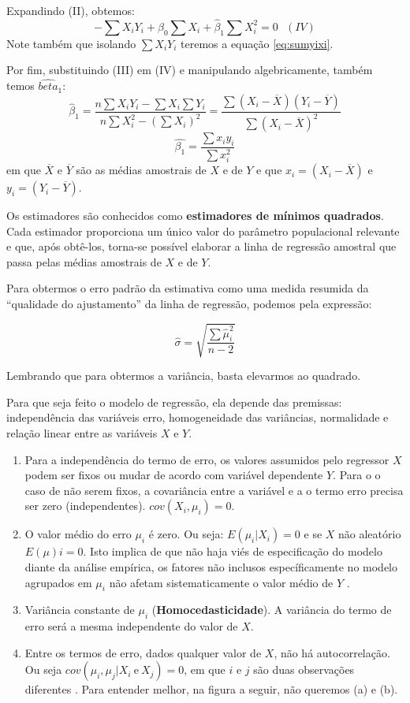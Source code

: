 \documentclass[
  openany]{book}
\begin{document}
Expandindo (II), obtemos:
\[-\sum X_iY_i+\hat{\beta}_0\sum X_i+\hat{\beta}_1\sum X_i^2=0 \ \ \ (IV)\]
Note também que isolando \(\sum X_i Y_i\) teremos a equação \eqref{eq:sumyixi}.

Por fim, substituindo (III) em (IV) e manipulando algebricamente, também temos \(\hat{beta}_1\):
\[\hat{\beta}_1=\frac{n\sum X_iY_i-\sum X_i \sum Y_i}{n\sum X_i^2-(\sum X_i)^2}=\frac{\sum (X_i-\overline{X})(Y_i-\overline{Y})}{\sum(X_i-\overline{X})^2}\]
\begin{equation}
\hat{\beta_1}=\frac{\sum x_i y_i}{\sum x_i^2}
\label{eq:betaum}
\end{equation}
em que \(\overline{X}\) e \(\overline{Y}\) são as médias amostrais de \(X\) e de \(Y\) e que \(x_i=(X_i-\overline{X})\) e \(y_i=(Y_i-\overline{Y})\).

Os estimadores são conhecidos como \textbf{estimadores de mínimos quadrados}. Cada estimador proporciona um único valor do parâmetro populacional relevante e que, após obtê-los, torna-se possível elaborar a linha de regressão amostral que passa pelas médias amostrais de \(X\) e de \(Y\).

Para obtermos o erro padrão da estimativa como uma medida resumida da ``qualidade do ajustamento'' da linha de regressão, podemos pela expressão:

\begin{equation}
\hat{\sigma}=\sqrt{\frac{\sum \hat{\mu}_i^2}{n-2}}
\label{eq:desvioreg}
\end{equation}

Lembrando que para obtermos a variância, basta elevarmos ao quadrado.

Para que seja feito o modelo de regressão, ela depende das premissas: independência das variáveis erro, homogeneidade das variâncias, normalidade e relação linear entre as variáveis \(X\) e \(Y\).

\begin{enumerate}
\def\labelenumi{\arabic{enumi}.}
\item
  Para a independência do termo de erro, os valores assumidos pelo regressor \(X\) podem ser fixos ou mudar de acordo com variável dependente \(Y\). Para o o caso de não serem fixos, a covariância entre a variável e a o termo erro precisa ser zero (independentes). \(cov(X_i,\mu_i)=0\).
\item
  O valor médio do erro \(\mu_i\) é zero. Ou seja: \(E(\mu_i|X_i)=0\) e se \(X\) não aleatório \(E(\mu)i=0\). Isto implica de que não haja viés de especificação do modelo diante da análise empírica, os fatores não inclusos específicamente no modelo agrupados em \(\mu_i\) não afetam sistematicamente o valor médio de \(Y\) \citep{gujarati2011econometria}.
\item
  Variância constante de \(\mu_i\) (\textbf{Homocedasticidade}). A variância do termo de erro será a mesma independente do valor de \(X\).
\item
  Entre os termos de erro, dados qualquer valor de \(X\), não há autocorrelação. Ou seja \(cov(\mu_i,\mu_j|X_i \ \mbox{e} \ X_j)=0\), em que \(i\) e \(j\) são duas observações diferentes \citep{gujarati2011econometria}. Para entender melhor, na figura a seguir, não queremos (a) e (b).
\end{enumerate}
\end{document}
